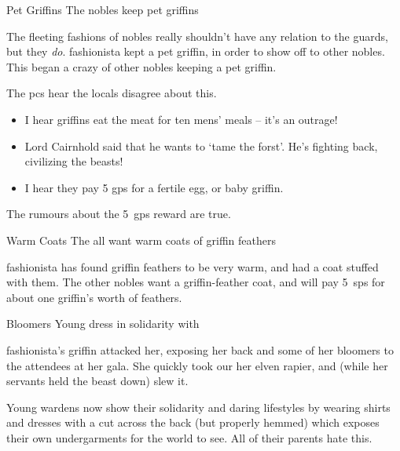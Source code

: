 
\ifcase\value{temperature}

  {Pet Griffins}%
  {The nobles keep pet griffins}%

  The fleeting fashions of nobles really shouldn't have any relation to the \glspl{guard}, but they \emph{do}.
  \Gls{fashionista} kept a pet griffin, in order to show off to other nobles.
  This began a crazy of other nobles keeping a pet griffin.

  The \glspl{pc} hear the locals disagree about this.

  \begin{itemize}
    \it
    \item
    I hear griffins eat the meat for ten mens' meals -- it's an outrage!
    \item
    Lord Cairnhold said that he wants to `tame the forst'.
    He's fighting back, civilizing the beasts!
    \item
    I hear they pay 5 \glspl{gp} for a fertile egg, or baby griffin.
  \end{itemize}

  The rumours about the 5~\glspl{gp} reward are true.

\or

  {Warm Coats}%
  {The  all want warm coats of griffin feathers}%

  \Gls{fashionista} has found griffin feathers to be very warm, and had a coat stuffed with them.
  The other nobles want a griffin-feather coat, and will pay 5~\glspl{sp} for about one griffin's worth of feathers.

\else

  {Bloomers}%
  {Young  dress in solidarity with }%

  \begin{exampletext}
    \Gls{fashionista}'s griffin attacked her, exposing her back and some of her bloomers to the attendees at her gala.
    She quickly took our her elven rapier, and (while her servants held the beast down) slew it.
  \end{exampletext}

  Young \glspl{warden} now show their solidarity and daring lifestyles by wearing shirts and dresses with a cut across the back (but properly hemmed) which exposes their own undergarments for the world to see.
  All of their parents hate this.
\fi
